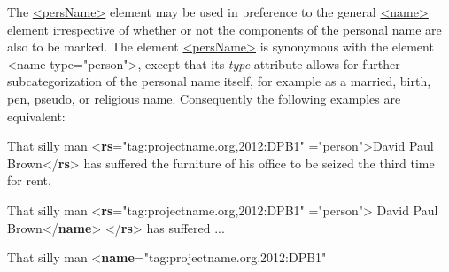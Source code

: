 The \hyperref[TEI.persName]{<persName>} element may be used in preference to the general \hyperref[TEI.name]{<name>} element irrespective of whether or not the components of the personal name are also to be marked. The element \hyperref[TEI.persName]{<persName>} is synonymous with the element <name type="person">, except that its {\itshape type} attribute allows for further subcategorization of the personal name itself, for example as a married, birth, pen, pseudo, or religious name. Consequently the following examples are equivalent: \par\bgroup{}\exampleFont \begin{shaded}\noindent\mbox{}That silly man {<\textbf{rs}\hspace*{1em}{ref}="{tag:projectname.org,2012:DPB1}"\mbox{}\newline 
\hspace*{1em}{type}="{person}">}David Paul Brown{</\textbf{rs}>} has suffered the furniture of his office to be seized the third time for\mbox{}\newline 
 rent.\end{shaded}\egroup\par \noindent  \par\bgroup{}\exampleFont \begin{shaded}\noindent\mbox{}That silly man {<\textbf{rs}\hspace*{1em}{ref}="{tag:projectname.org,2012:DPB1}"\mbox{}\newline 
\hspace*{1em}{type}="{person}">}\mbox{}\newline 
{}David Paul Brown{</\textbf{name}>}\mbox{}\newline 
{</\textbf{rs}>} has suffered ...\end{shaded}\egroup\par \noindent  \par\bgroup{}\exampleFont \begin{shaded}\noindent\mbox{}That silly man {<\textbf{name}\hspace*{1em}{ref}="{tag:projectname.org,2012:DPB1}"\mbox{}\newline 
}
\end{shaded}
